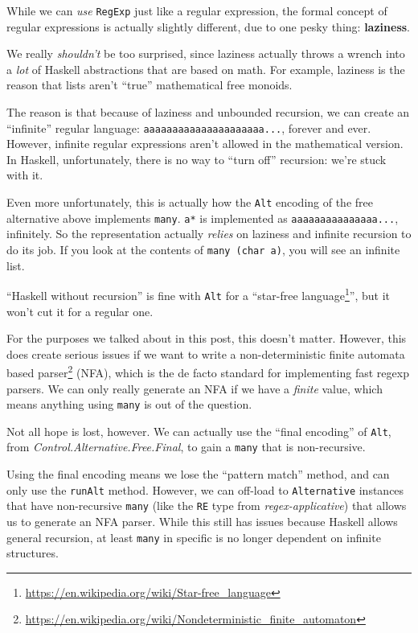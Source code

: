 \documentclass[]{article}
\renewcommand{\href}[2]{#2\footnote{\url{#1}}}
\begin{document}
While we can \emph{use} \texttt{RegExp} just like a regular expression, the
formal concept of regular expressions is actually slightly different, due to one
pesky thing: \textbf{laziness}.

We really \emph{shouldn't} be too surprised, since laziness actually throws a
wrench into a \emph{lot} of Haskell abstractions that are based on math. For
example, laziness is the reason that lists aren't ``true'' mathematical free
monoids.

The reason is that because of laziness and unbounded recursion, we can create an
``infinite'' regular language:
\texttt{a\textbar{}aa\textbar{}aaa\textbar{}aaaa\textbar{}aaaaa\textbar{}aaaaaa\textbar{}...},
forever and ever. However, infinite regular expressions aren't allowed in the
mathematical version. In Haskell, unfortunately, there is no way to ``turn off''
recursion: we're stuck with it.

Even more unfortunately, this is actually how the \texttt{Alt} encoding of the
free alternative above implements \texttt{many}. \texttt{a*} is implemented as
\texttt{\textbar{}a\textbar{}aa\textbar{}aaa\textbar{}aaaa\textbar{}aaaaa\textbar{}...},
infinitely. So the representation actually \emph{relies} on laziness and
infinite recursion to do its job. If you look at the contents of
\texttt{many\ (char\ \textquotesingle{}a\textquotesingle{})}, you will see an
infinite list.

``Haskell without recursion'' is fine with \texttt{Alt} for a
``\href{https://en.wikipedia.org/wiki/Star-free_language}{star-free language}'',
but it won't cut it for a regular one.

For the purposes we talked about in this post, this doesn't matter. However,
this does create serious issues if we want to write a
\href{https://en.wikipedia.org/wiki/Nondeterministic_finite_automaton}{non-deterministic
finite automata based parser} (NFA), which is the de facto standard for
implementing fast regexp parsers. We can only really generate an NFA if we have
a \emph{finite} value, which means anything using \texttt{many} is out of the
question.

Not all hope is lost, however. We can actually use the ``final encoding'' of
\texttt{Alt}, from \emph{Control.Alternative.Free.Final}, to gain a
\texttt{many} that is non-recursive.

Using the final encoding means we lose the ``pattern match'' method, and can
only use the \texttt{runAlt} method. However, we can off-load to
\texttt{Alternative} instances that have non-recursive \texttt{many} (like the
\texttt{RE} type from \emph{regex-applicative}) that allows us to generate an
NFA parser. While this still has issues because Haskell allows general
recursion, at least \texttt{many} in specific is no longer dependent on infinite
structures.
\end{document}
